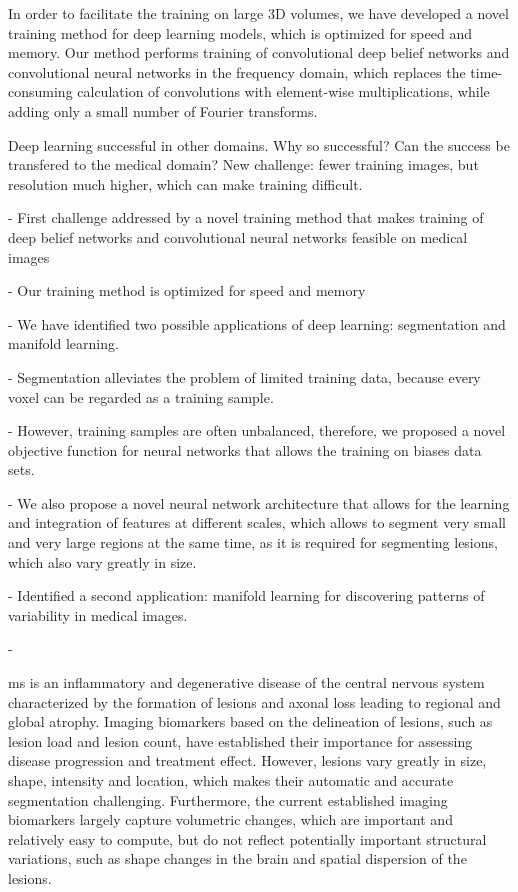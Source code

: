 In order to facilitate the training on large 3D volumes, we have developed a
novel training method for deep learning models, which is optimized for speed and
memory. Our method performs training of convolutional deep belief networks and
convolutional neural networks in the frequency domain, which replaces the
time-consuming calculation of convolutions with element-wise multiplications,
while adding only a small number of Fourier transforms.




Deep learning successful in other domains. Why so successful? Can the success be
transfered to the medical domain? New challenge: fewer training images, but
resolution much higher, which can make training difficult.

- First challenge addressed by a novel training method that makes training
  of deep belief networks and convolutional neural networks feasible on medical
  images
  
- Our training method is optimized for speed and memory

- We have identified two possible applications of deep learning: segmentation
  and manifold learning.
  
- Segmentation alleviates the problem of limited training data, because every
  voxel can be regarded as a training sample.
  
- However, training samples are often unbalanced, therefore, we proposed a novel
  objective function for neural networks that allows the training on biases
  data sets.
  
- We also propose a novel neural network architecture that allows for the
  learning and integration of features at different scales, which allows to
  segment very small and very large regions at the same time, as it is required
  for segmenting lesions, which also vary greatly in size.

- Identified a second application: manifold learning for discovering patterns of
  variability in medical images.
  
- 




\Gls{ms} is an inflammatory and degenerative disease of the central nervous
system characterized by the formation of lesions and axonal loss leading to
regional and global atrophy. Imaging biomarkers based on the delineation of
lesions, such as lesion load and lesion count, have established their importance
for assessing disease progression and treatment effect. However, lesions vary
greatly in size, shape, intensity and location, which makes their automatic and
accurate segmentation challenging. Furthermore, the current established imaging
biomarkers largely capture volumetric changes, which are important and
relatively easy to compute, but do not reflect potentially important structural
variations, such as shape changes in the brain and spatial dispersion of the
lesions.


